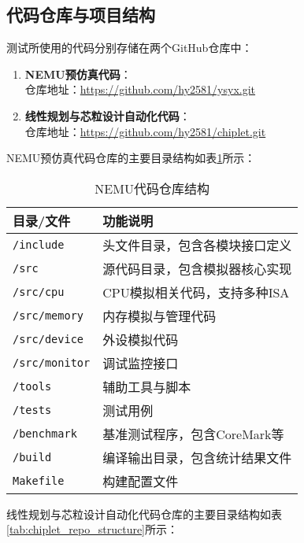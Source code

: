 \documentclass[bachelor]{thesis-uestc}
\begin{document}
\subsection{代码仓库与项目结构}

测试所使用的代码分别存储在两个GitHub仓库中：

\begin{enumerate}
    \item \textbf{NEMU预仿真代码}：\\
    仓库地址：\url{https://github.com/hy2581/ysyx.git}
    
    \item \textbf{线性规划与芯粒设计自动化代码}：\\
    仓库地址：\url{https://github.com/hy2581/chiplet.git}
\end{enumerate}

NEMU预仿真代码仓库的主要目录结构如表\ref{tab:nemu_repo_structure}所示：

\begin{table}[htbp]
\caption{NEMU代码仓库结构}
\centering
\begin{tabular}{|l|p{10cm}|}
\hline
\textbf{目录/文件} & \textbf{功能说明} \\
\hline
\texttt{/include} & 头文件目录，包含各模块接口定义 \\
\hline
\texttt{/src} & 源代码目录，包含模拟器核心实现 \\
\hline
\texttt{/src/cpu} & CPU模拟相关代码，支持多种ISA \\
\hline
\texttt{/src/memory} & 内存模拟与管理代码 \\
\hline
\texttt{/src/device} & 外设模拟代码 \\
\hline
\texttt{/src/monitor} & 调试监控接口 \\
\hline
\texttt{/tools} & 辅助工具与脚本 \\
\hline
\texttt{/tests} & 测试用例 \\
\hline
\texttt{/benchmark} & 基准测试程序，包含CoreMark等 \\
\hline
\texttt{/build} & 编译输出目录，包含统计结果文件 \\
\hline
\texttt{Makefile} & 构建配置文件 \\
\hline
\end{tabular}
\label{tab:nemu_repo_structure}
\end{table}

线性规划与芯粒设计自动化代码仓库的主要目录结构如表\ref{tab:chiplet_repo_structure}所示：
\end{document}
